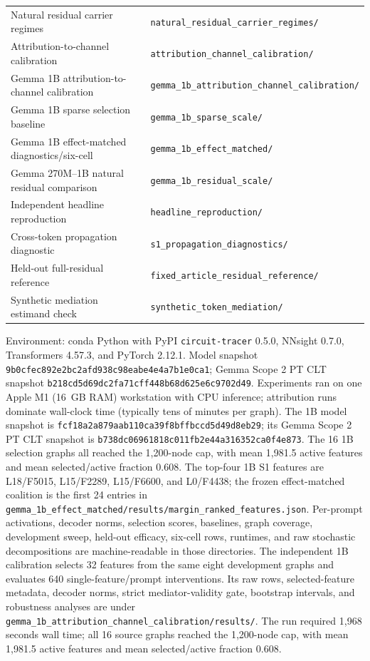 \begin{center}
\begin{tabular}{ll}
Natural residual carrier regimes & \texttt{natural\_residual\_carrier\_regimes/} \\
Attribution-to-channel calibration & \texttt{attribution\_channel\_calibration/} \\
Gemma 1B attribution-to-channel calibration & \texttt{gemma\_1b\_attribution\_channel\_calibration/} \\
Gemma 1B sparse selection baseline & \texttt{gemma\_1b\_sparse\_scale/} \\
Gemma 1B effect-matched diagnostics/six-cell & \texttt{gemma\_1b\_effect\_matched/} \\
Gemma 270M--1B natural residual comparison & \texttt{gemma\_1b\_residual\_scale/} \\
Independent headline reproduction & \texttt{headline\_reproduction/} \\
Cross-token propagation diagnostic & \texttt{s1\_propagation\_diagnostics/} \\
Held-out full-residual reference & \texttt{fixed\_article\_residual\_reference/} \\
Synthetic mediation estimand check & \texttt{synthetic\_token\_mediation/} \\
\bottomrule
\end{tabular}
\end{center}

Environment: conda Python with PyPI \texttt{circuit-tracer} 0.5.0, NNsight
0.7.0, Transformers 4.57.3, and PyTorch 2.12.1. Model snapshot
\texttt{9b0cfec892e2bc2afd938c98eabe4e4a7b1e0ca1}; Gemma Scope 2 PT CLT
snapshot \texttt{b218cd5d69dc2fa71cff448b68d625e6c9702d49}. Experiments ran
on one Apple M1 (16~GB RAM) workstation with CPU inference; attribution
runs dominate wall-clock time (typically tens of minutes per graph).
The 1B model snapshot is
\texttt{fcf18a2a879aab110ca39f8bffbccd5d49d8eb29}; its Gemma Scope 2 PT
CLT snapshot is \texttt{b738dc06961818c011fb2e44a316352ca0f4e873}.
The 16 1B selection graphs all reached the 1,200-node cap, with mean 1,981.5
active features and mean selected/active fraction 0.608. The top-four 1B S1
features are L18/F5015, L15/F2289, L15/F6600, and L0/F4438; the frozen
effect-matched coalition is the first 24 entries in
\texttt{gemma\_1b\_effect\_matched/results/margin\_ranked\_features.json}.
Per-prompt activations, decoder norms, selection scores, baselines, graph
coverage, development sweep, held-out efficacy, six-cell rows, runtimes, and
raw stochastic decompositions are machine-readable in those directories.
The independent 1B calibration selects 32 features from the same eight
development graphs and evaluates 640 single-feature/prompt interventions. Its
raw rows, selected-feature metadata, decoder norms, strict mediator-validity
gate, bootstrap intervals, and robustness analyses are under
\texttt{gemma\_1b\_attribution\_channel\_calibration/results/}. The run required
1,968 seconds wall time; all 16 source graphs reached the 1,200-node cap, with
mean 1,981.5 active features and mean selected/active fraction 0.608.

